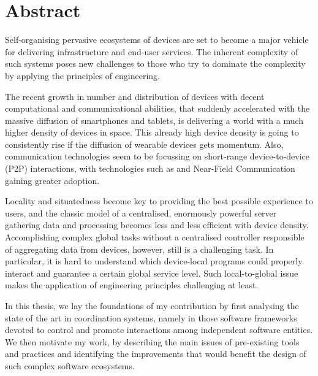 \documentclass[12pt,a4paper,twoside,openright]{book}
\begin{document}
%
\frontmatter
\maketitle
\pagestyle{plain}

\tableofcontents

\chapter*{\centering Abstract}

Self-organising pervasive ecosystems of devices are set to become a major vehicle for delivering infrastructure and end-user services.
%
The inherent complexity of such systems poses new challenges to those who try to dominate the complexity by applying the principles of engineering.

The recent growth in number and distribution of devices with decent computational and communicational abilities, that suddenly accelerated with the massive diffusion of smartphones and tablets, is delivering a world with a much higher density of devices in space.
%
This already high device density is going to consistently rise if the diffusion of wearable devices gets momentum.
%
Also, communication technologies seem to be focussing on short-range device-to-device (P2P) interactions, with technologies such as \btle{} and Near-Field Communication gaining greater adoption.

Locality and situatedness become key to providing the best possible experience to users, and the classic model of a centralised, enormously powerful server gathering data and processing becomes less and less efficient with device density.
%
Accomplishing complex global tasks without a centralised controller responsible of aggregating data from devices, however, still is a challenging task.
%
In particular, it is hard to understand which device-local programs could properly interact and guarantee a certain global service level.
%
Such local-to-global issue makes the application of engineering principles challenging at least.

In this thesis, we lay the foundations of my contribution by first analysing the state of the art in coordination systems, namely in those software frameworks devoted to control and promote interactions among independent software entities.
%
We then motivate my work, by describing the main issues of pre-existing tools and practices and identifying the improvements that would benefit the design of such complex software ecosystems.
\end{document}
